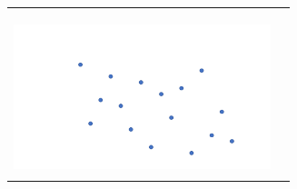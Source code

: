 \documentclass[a4paper,12pt]{article}
\begin{document}
\begin{center}
\begin{tabular}{|c|c|}
\hspace{10pt} & \hspace{10pt} \\
 & \\
\hline
 & \\
\hspace{10pt}\includegraphics[width=7.5cm]{../images/spatial_subd.pdf}
\hspace{10pt} & \hspace{10pt} \\
 & \\
\hline
\end{tabular}
\end{center}


\newpage
\end{document}
